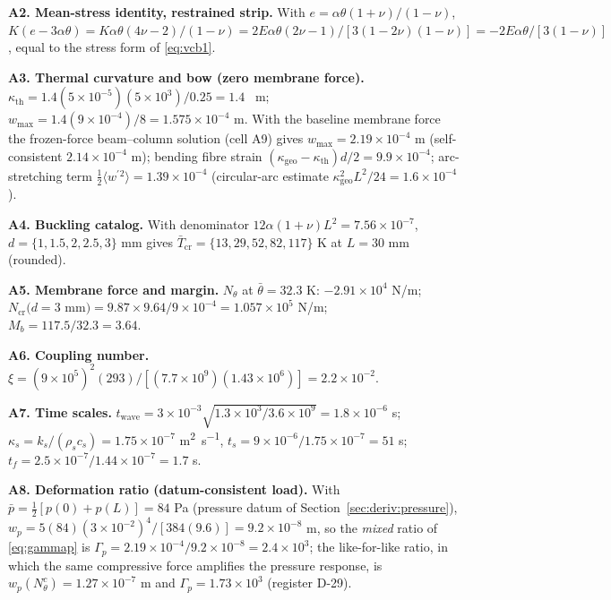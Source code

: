 \textbf{A2. Mean-stress identity, restrained strip.} With
$e=\alpha\theta(1+\nu)/(1-\nu)$, $K(e-3\alpha\theta)=K\alpha\theta(4\nu-2)/(1-\nu)
=2E\alpha\theta(2\nu-1)/[3(1-2\nu)(1-\nu)]=-2E\alpha\theta/[3(1-\nu)]$, equal to the stress form
of \eqref{eq:vcb1}.

\textbf{A3. Thermal curvature and bow (zero membrane force).} $\kappa_{\mathrm{th}}=1.4(5\times10^{-5})(5\times10^3)/0.25
=1.4$ \si{\per\metre}; $w_{\max}=1.4(9\times10^{-4})/8=1.575\times10^{-4}$ m. With the baseline
membrane force the frozen-force beam--column solution (cell A9) gives
$w_{\max}=2.19\times10^{-4}$ m (self-consistent $2.14\times10^{-4}$ m); bending
fibre strain $(\kappa_{\mathrm{geo}}-\kappa_{\mathrm{th}})d/2=9.9\times10^{-4}$; arc-stretching
term $\tfrac12\langle w^{'}{}^2\rangle=1.39\times10^{-4}$ (circular-arc estimate
$\kappa_{\mathrm{geo}}^2L^2/24=1.6\times10^{-4}$).

\textbf{A4. Buckling catalog.} With denominator $12\alpha(1+\nu)L^2=7.56\times10^{-7}$,
$d=\{1,1.5,2,2.5,3\}$ mm gives $\bar T_{\mathrm{cr}}=\{13,29,52,82,117\}$ K at $L=30$ mm
(rounded).

\textbf{A5. Membrane force and margin.} $N_\theta$ at $\bar\theta=32.3$ K: $-2.91\times10^4$ N/m;
$N_{\mathrm{cr}}(d=3$ mm$)=9.87\times9.64/9\times10^{-4}=1.057\times10^5$ N/m;
$M_b=117.5/32.3=3.64$.

\textbf{A6. Coupling number.} $\xi=(9\times10^5)^2(293)/[(7.7\times10^9)(1.43\times10^6)]
=2.2\times10^{-2}$.

\textbf{A7. Time scales.} $t_{\mathrm{wave}}=3\times10^{-3}\sqrt{1.3\times10^3/3.6\times10^9}
=1.8\times10^{-6}$ s; $\kappa_s=k_s/(\rho_sc_s)=1.75\times10^{-7}$ \si{\square\metre\per\second},
$t_s=9\times10^{-6}/1.75\times10^{-7}=51$ s; $t_f=2.5\times10^{-7}/1.44\times10^{-7}=1.7$ s.

\textbf{A8. Deformation ratio (datum-consistent load).} With $\bar p=\tfrac12[p(0)+p(L)]=84$ Pa
(pressure datum of Section~\ref{sec:deriv:pressure}),
$w_p=5(84)(3\times10^{-2})^4/[384(9.6)]=9.2\times10^{-8}$ m, so the \emph{mixed} ratio of
\eqref{eq:gammap} is $\Gamma_p=2.19\times10^{-4}/9.2\times10^{-8}=2.4\times10^3$; the like-for-like
ratio, in which the same compressive force amplifies the pressure response, is
$w_p(N_\theta^c)=1.27\times10^{-7}$ m and $\Gamma_p=1.73\times10^3$ (register D-29).

